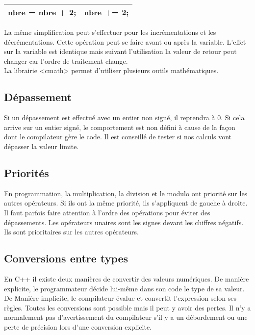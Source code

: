 \documentclass{article}
\begin{document}
\bigskip %
\begin{tabular}{|l|l|}  

\hline %
nbre = nbre + 2; & nbre += 2; \\
\hline %

\end{tabular} 
\bigskip %

La même simplification peut s'effectuer pour les incrémentations et les décrémentations. Cette opération peut se faire avant ou après la variable. L'effet sur la variable est identique mais suivant l'utilisation la valeur de retour peut changer car l'ordre de traitement change. \\
La librairie <cmath> permet d'utiliser plusieurs outils mathématiques. 

\subsection{Dépassement}
Si un dépassement est effectué avec un entier non signé, il reprendra à 0. Si cela arrive sur un entier signé, le comportement est non défini à cause de la façon dont le compilateur gère le code. Il est conseillé de tester si nos calculs vont dépasser la valeur limite. 

\subsection{Priorités}
En programmation, la multiplication, la division et le modulo ont priorité sur les autres opérateurs. Si ils ont la même priorité, ils s'appliquent de gauche à droite. Il faut parfois faire attention à l'ordre des opérations pour éviter des dépassements. Les opérateurs unaires sont les signes devant les chiffres négatifs. Ils sont prioritaires sur les autres opérateurs. 

\subsection{Conversions entre types}
En C++ il existe deux manières de convertir des valeurs numériques. De manière explicite, le programmateur décide lui-même dans son code le type de sa valeur. De Manière implicite, le compilateur évalue et convertit l'expression selon ses règles. Toutes les conversions sont possible mais il peut y avoir des pertes. Il n'y a normalement pas d'avertissement du compilateur s'il y a un débordement ou une perte de précision lors d'une conversion explicite. 
\end{document}
